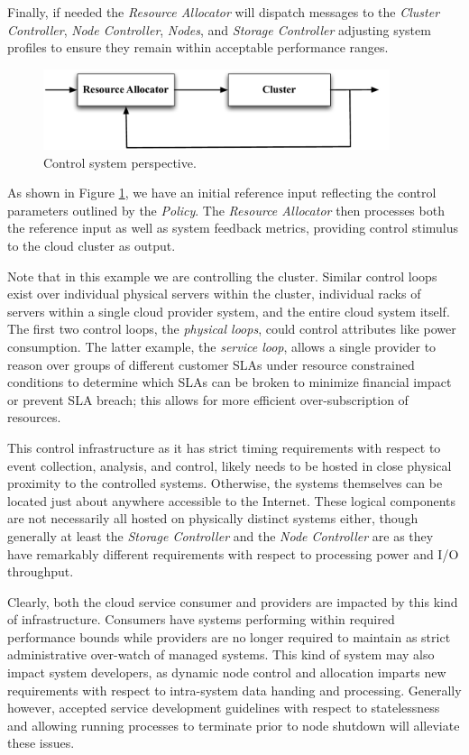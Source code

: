 \documentclass[notitlepage]{book}
\begin{document}
\begin{doublespace}
Finally, if needed the \textit{Resource Allocator} will dispatch messages to the \textit{Cluster Controller}, \textit{Node Controller}, \textit{Nodes}, and \textit{Storage Controller} adjusting system profiles to ensure they remain within acceptable performance ranges.

\begin{figure}[!t]
\centering
\includegraphics[width=4in]{feedback}
\caption{Control system perspective.}
\label{fig:feedback}
\end{figure}

As shown in Figure \ref{fig:feedback}, we have an initial reference input reflecting the control parameters outlined by the \textit{Policy}.  The \textit{Resource Allocator} then processes both the reference input as well as system feedback metrics, providing control stimulus to the cloud cluster as output.

Note that in this example we are controlling the cluster.  Similar control loops exist over individual physical servers within the cluster, individual racks of servers within a single cloud provider system, and the entire cloud system itself. The first two control loops, the \textit{physical loops}, could control attributes like power consumption.  The latter example, the \textit{service loop}, allows a single provider to reason over groups of different customer SLAs under resource constrained conditions to determine which SLAs can be broken to minimize financial impact or prevent SLA breach; this allows for more efficient over-subscription of resources.

This control infrastructure as it has strict timing requirements with respect to event collection, analysis, and control, likely needs to be hosted in close physical proximity to the controlled systems.  Otherwise, the systems themselves can be located just about anywhere accessible to the Internet.  These logical components are not necessarily all hosted on physically distinct systems either, though generally at least the \textit{Storage Controller} and the \textit{Node Controller} are as they have remarkably different requirements with respect to processing power and I/O throughput.

Clearly, both the cloud service consumer and providers are impacted by this kind of infrastructure.  Consumers have systems performing within required performance bounds while providers are no longer required to maintain as strict administrative over-watch of managed systems.  This kind of system may also impact system developers, as dynamic node control and allocation imparts new requirements with respect to intra-system data handing and processing.  Generally however, accepted service development guidelines with respect to statelessness and allowing running processes to terminate prior to node shutdown will alleviate these issues.


\end{doublespace}
\end{document}
